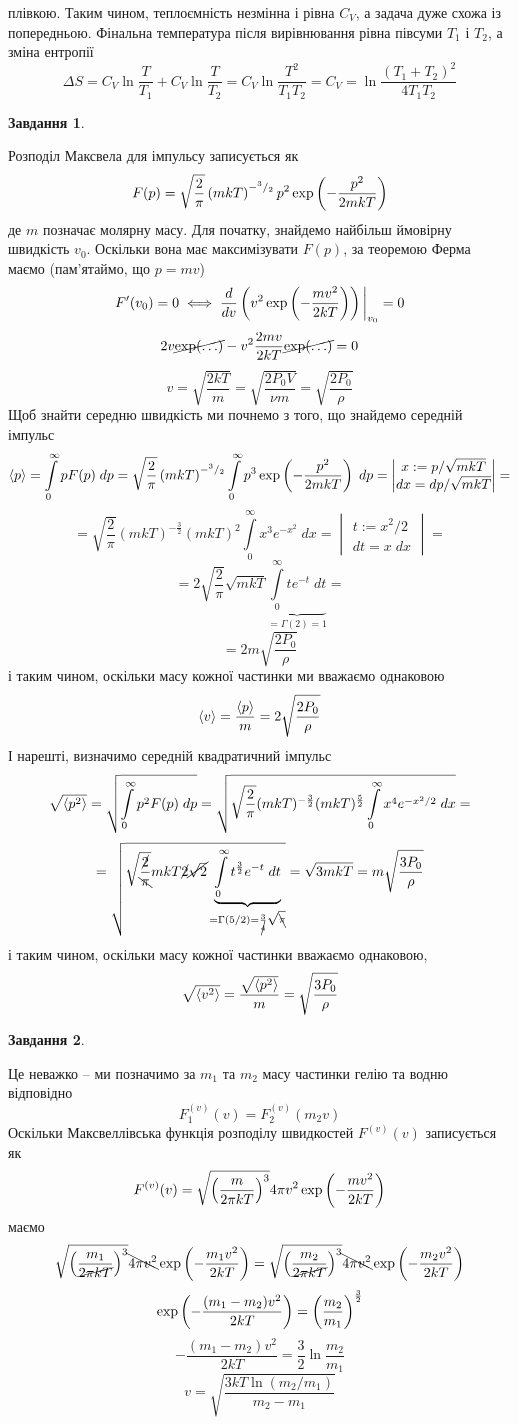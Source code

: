 \documentclass[12pt]{article} %
\newtheorem{prob}{Завдання}
\newcommand{\dt}{\;dt}
\newcommand{\dx}{\;dx}
\newcommand{\dpp}{\;dp}
\let\oldint\int
\renewcommand{\int}{\oldint\limits}
\begin{document}
	плівкою. Таким чином, теплоємність незмінна і рівна $C_V$, а задача дуже схожа із попередньою. Фінальна температура після вирівнювання
	рівна півсуми $T_1$ і $T_2$, а зміна ентропії
	\[\Delta S=C_V\ln\frac{T}{T_1}+C_V\ln\frac{T}{T_2}=C_V\ln\frac{T^2}{T_1T_2}=C_V=\ln\frac{(T_1+T_2)^2}{4T_1T_2}\]
\setcounter{prob}{0}
\begin{prob}\end{prob}%
	Розподіл Максвела для імпульсу записується як
	\[F(p)=\sqrt{\frac{2}{\pi}}\left(mkT\right)^{-{^{3}/_{2}}}p^2\exp\left(-\frac{p^2}{2mkT}\right)\]
	де $m$ позначає молярну масу. Для початку, знайдемо найбільш ймовірну швидкість $v_0$. Оскільки вона має максимізувати $F(p)$, за
	теоремою Ферма маємо (пам’ятаймо, що $p=mv$)
	\[F'(v_0)=0\iff \frac{d}{dv}\left(v^2\exp\left(-\frac{mv^2}{2kT}\right)\right)\bigg|_{v_0}=0\]
	\[2v\cancel{\exp(\hdots)}-v^2\frac{2mv}{2kT}\cancel{\exp(\hdots)}=0\]
	\[v=\sqrt{\frac{2kT}{m}}=\sqrt{\frac{2P_0V}{\nu m}}=\sqrt{\frac{2P_0}{\rho}}\]
	Щоб знайти середню швидкість ми почнемо з того, що знайдемо середній імпульс
	\[\myabra{p}=\int_0^{\infty}pF(p)\dpp=\sqrt{\frac{2}{\pi}}\mybra{mkT}^{-\myfrac{3}{2}}
	\int_0^\infty p^3\exp\mybra{-\frac{p^2}{2mkT}}\dpp=\begin{vmatrix}x:=p/\sqrt{mkT}\\dx=dp/\sqrt{mkT}\end{vmatrix}=\]
	\[=\sqrt{\frac{2}{\pi}}(mkT)^{-\frac{3}{2}}(mkT)^2\int_0^\infty x^3e^{-x^2}\dx=
	\begin{vmatrix}t:=x^2/2\\dt=x\;dx\end{vmatrix}=\]
	\[=2\sqrt{\frac{2}{\pi}}\sqrt{mkT}\underbrace{\int_0^\infty te^{-t}\dt}_{=\Gamma(2)=1}=\]
	\[=2m\sqrt{\frac{2P_0}{\rho}}\]
	і таким чином, оскільки масу кожної частинки ми вважаємо однаковою
	\[\left<v\right>=\frac{\left<p\right>}{m}=2\sqrt{\frac{2P_0}{\rho}}\]
	І нарешті, визначимо середній квадратичний імпульс
	\[\sqrt{\myabra{p^2}}=\sqrt{\int_0^\infty p^2F(p)\dpp}=\sqrt{\sqrt{\frac{2}{\pi}}(mkT)^{-\frac{3}{2}}(mkT)^{\frac{5}{2}}
	\int_0^\infty x^4e^{-x^2/2}\dx}=\]
	\[=\sqrt{\sqrt{\frac{\cancel{2}}{\bcancel{\pi}}}mkT\cancel{2}\cancel{\sqrt{2}}\underbrace{\int_0^\infty t^{\frac{3}{2}}e^{-t}\dt}_{=\Gamma(5/2)=\frac{3}{\cancel{4}}
	\sqrt{\bcancel{\pi}}}}=\sqrt{3mkT}=m\sqrt{\frac{3P_0}{\rho}}\]
	і таким чином, оскільки масу кожної частинки вважаємо однаковою,
	\[\sqrt{\left<v^2\right>}=\frac{\sqrt{\left<p^2\right>}}{m}=\sqrt{\frac{3P_0}{\rho}}\]
\begin{prob}\end{prob}%
	Це неважко -- ми позначимо за $m_1$ та $m_2$ масу частинки гелію та водню відповідно
	\[F^{(v)}_1(v)=F^{(v)}_2(m_2v)\]
	Оскільки Максвеллівська функція розподілу швидкостей $F^{(v)}(v)$ записується як
	\[F^{(v)}(v)=\sqrt{\left(\frac{m}{2\pi kT}\right)^3}4\pi v^2\exp\left(-\frac{mv^2}{2kT}\right)\]
	маємо
	\[\sqrt{\left(\frac{m_1}{\cancel{2\pi kT}}\right)^3}\bcancel{4\pi v^2}\exp\left(-\frac{m_1v^2}{2kT}\right)
	=\sqrt{\left(\frac{m_2}{\cancel{2\pi kT}}\right)^3}\bcancel{4\pi v^2}\exp\left(-\frac{m_2v^2}{2kT}\right)\]
	\[\exp\left(-\frac{(m_1-m_2)v^2}{2kT}\right)=\left(\frac{m_2}{m_1}\right)^{\frac{3}{2}}\]
	\[{-\frac{(m_1-m_2)v^2}{2kT}}=\frac{3}{2}\ln{\frac{m_2}{m_1}}\]
	\[v=\sqrt{\frac{3kT\ln(m_2/m_1)}{m_2-m_1}}\]
\end{document}
